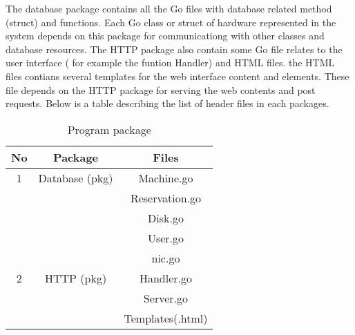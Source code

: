 The database package contains all the Go files with database related method (struct) and functions. Each Go class or struct of hardware represented in the system depends on this package for communicationg with other classes and database resources. The HTTP package also contain some Go file relates to the user interface ( for example the funtion Handler) and HTML files. the HTML files contians several templates for the web interface content and elements. These file depends on the HTTP package for serving the web contents and post requests. Below is a table describing the list of header files in each packages.
\pagebreak
\begin{table}[h!]
  \centering
  \label{tab:table1}
  \begin{tabular}{ccc}
    \hline
    No & Package & Files\\
   \hline
    1 &Database (pkg)& Machine.go\\
       &&Reservation.go\\
      &&Disk.go\\
      &&User.go\\
      &&nic.go\\
    \hline
    2 &HTTP (pkg)& Handler.go\\
    &&Server.go\\
    &&Templates(.html)\\
    \hline
  \end{tabular}
  \caption{Program package}
\end{table}

